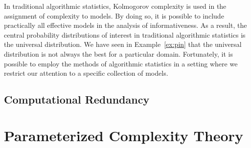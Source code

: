 In traditional algorithmic statistics, Kolmogorov complexity is used in the assignment of complexity to models.
By doing so, it is possible to include practically all effective models in the analysis of informativeness.
As a result, the central probability distributions of interest in traditional algorithmic statistics is the universal distribution.
We have seen in Example~\ref{ex:pin} that the universal distribution is not always the best for a particular domain.
Fortunately, it is possible to employ the methods of algorithmic statistics in a setting where we restrict our attention to a specific collection of models.

\subsection{Computational Redundancy}


\section{Parameterized Complexity Theory}
\label{sec:parameterized_complexity_theory}%
